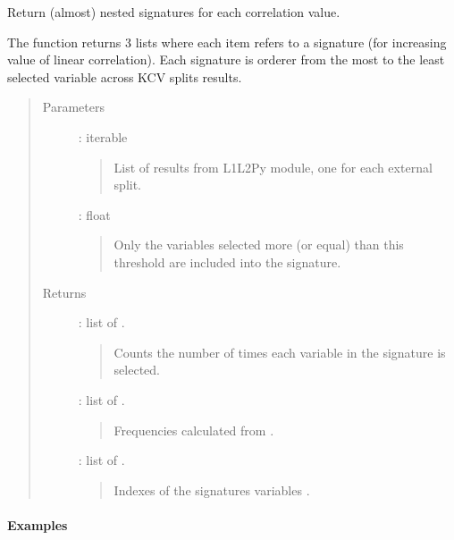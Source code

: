 \documentclass[letterpaper,10pt,english]{sphinxmanual}
\begin{document}
\begin{fulllineitems}
\label{\detokenize{api:palladio.utils.signatures}}
Return (almost) nested signatures for each correlation value.

The function returns 3 lists where each item refers to a signature
(for increasing value of linear correlation).
Each signature is orderer from the most to the least selected variable
across KCV splits results.
\begin{quote}\begin{description}
\item[{Parameters}] \leavevmode
{} : iterable
\begin{quote}

List of results from L1L2Py module, one for each external split.
\end{quote}

 : float
\begin{quote}

Only the variables selected more (or equal) than this threshold are
included into the signature.
\end{quote}

\item[{Returns}] \leavevmode
{} : list of .
\begin{quote}

Counts the number of times each variable in the signature is selected.
\end{quote}

 : list of .
\begin{quote}

Frequencies calculated from .
\end{quote}

 : list of .
\begin{quote}

Indexes of the signatures variables .
\end{quote}

\end{description}\end{quote}
\paragraph{Examples}


\end{fulllineitems}
\end{document}
